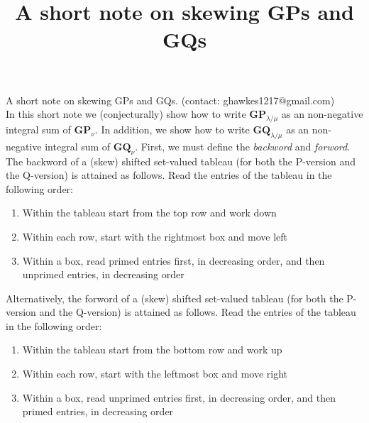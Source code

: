 \documentclass[]{amsart}
\theoremstyle{definition}
\begin{document}
\title[A short note on skewing GPs and GQs]{A short note on skewing GPs and GQs}











\noindent A short note on skewing GPs and GQs.  (contact: ghawkes1217@gmail.com)\\



In this short note we (conjecturally) show how to write $\mathbf{GP}_{\lambda/\mu}$ as an non-negative integral sum of $\mathbf{GP}_{\nu}$.  In addition, we show how to write $\mathbf{GQ}_{\lambda/\mu}$ as an non-negative integral sum of $\mathbf{GQ}_{\nu}$.  First, we must define the \emph{backword} and \emph{forword}.  The backword of a (skew) shifted set-valued tableau (for both the P-version and the Q-version) is attained as follows.  Read the entries of the tableau in the following order:

\begin{enumerate}
\item Within the tableau start from the top row and work down
\item Within each row, start with the rightmost box and move left
\item  Within a box, read primed entries first, in decreasing order, and then unprimed entries, in decreasing order
\end{enumerate}


 Alternatively, the forword of a (skew) shifted set-valued tableau (for both the P-version and the Q-version) is attained as follows.  Read the entries of the tableau in the following order:

\begin{enumerate}
\item Within the tableau start from the bottom row and work up
\item Within each row, start with the leftmost box and move right
\item Within a box, read unprimed entries first, in decreasing order, and then primed entries, in decreasing order
\end{enumerate}
\end{document}
